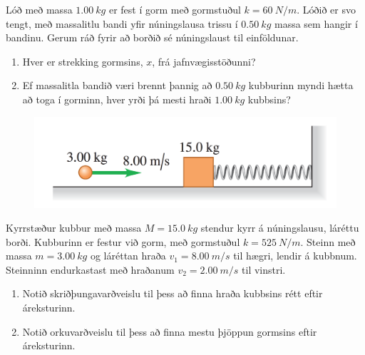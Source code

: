 \ifdefined \wholebook \else\documentclass[oneside]{book}\usepackage{EdlBook}\graphicspath{{figures/}}
\begin{document}
\begin{enumerate}[label = \textbf{Dæmi \thechapter.\arabic*.}]
\begin{minipage}{\linewidth}
\item Lóð með massa $\SI{1.00}{kg}$ er fest í gorm með gormstuðul $k = \SI{60}{N/m}$. Lóðið er svo  tengt, með massalitlu bandi yfir núningslausa trissu í $\SI{0.50}{kg}$ massa sem hangir í bandinu. Gerum ráð fyrir að borðið sé núningslaust til einföldunar.
\begin{enumerate}[label = \textbf{(\alph*)}]
    \item Hver er strekking gormsins, $x$, frá jafnvægisstöðunni?
    
    \item Ef massalitla bandið væri brennt þannig að $\SI{0.50}{kg}$ kubburinn myndi hætta að toga í gorminn, hver yrði þá mesti hraði $\SI{1.00}{kg}$ kubbsins?
\end{enumerate}

\end{minipage}

\begin{minipage}{\linewidth}
\begin{figure}
\vspace{-0.75cm}
\includegraphics[scale=0.25]{temp/prob.png}
\end{figure}

\item Kyrrstæður kubbur með massa $M = \SI{15.0}{kg}$ stendur kyrr á núningslausu, láréttu borði. Kubburinn er festur við gorm, með gormstuðul $k = \SI{525}{N/m}$. Steinn með massa $m = \SI{3.00}{kg}$ og láréttan hraða $v_1 = \SI{8.00}{m/s}$ til hægri, lendir á kubbnum. Steinninn endurkastast með hraðanum $v_2 = \SI{2.00}{m/s}$ til vinstri.
\end{minipage}

\begin{enumerate}[label = \textbf{(\alph*)}]
    \item Notið skriðþungavarðveislu til þess að finna hraða kubbsins rétt eftir áreksturinn.
    \item Notið orkuvarðveislu til þess að finna mestu þjöppun gormsins eftir áreksturinn.
\end{enumerate}



\end{enumerate}
\end{document}
